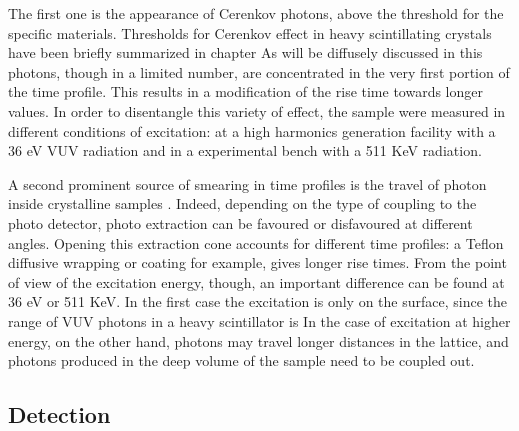 The first one is the appearance of Cerenkov photons, above the threshold for the specific materials. Thresholds for Cerenkov effect in heavy scintillating crystals have been briefly summarized in chapter %
As will be diffusely discussed in %
this photons, though in a limited number, are concentrated in the very first portion of the time profile. This results in a modification of the rise time towards longer values.
In order to disentangle this variety of effect, the sample were measured in different conditions of excitation: at a high harmonics generation facility with a 36 eV VUV radiation and in a experimental bench with a 511 KeV radiation.

A second prominent source of smearing in time profiles is the travel of photon inside crystalline samples \cite{Derenzo2000}. Indeed, depending on the type of coupling to the photo detector, photo extraction can be favoured or disfavoured at different angles. Opening this extraction cone accounts for different time profiles: a Teflon diffusive wrapping or coating for example, gives longer rise times. From the point of view of the excitation energy, though, an important difference can be found at 36 eV or 511 KeV. In the first case the excitation is only on the surface, since the range of VUV photons in a heavy scintillator is
In the case of excitation at higher energy, on the other hand, photons may travel longer distances in the lattice, and photons produced in the deep volume of the sample need to be coupled out.

\subsection{Detection}

